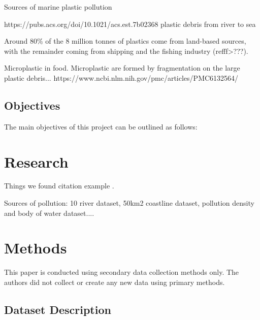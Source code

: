 \documentclass[10pt]{article}\usepackage[]{graphicx}\usepackage[]{color}
\begin{document}
Sources of marine plastic pollution

https://pubs.acs.org/doi/10.1021/acs.est.7b02368 plastic debris from river to sea

Around 80\% of the 8 million tonnes of plastics come from land-based sources, with the remainder coming from shipping and the fishing industry (refff>???). 

Microplastic in food. Microplastic are formed by fragmentation on the large plastic debris...
https://www.ncbi.nlm.nih.gov/pmc/articles/PMC6132564/



\subsection{Objectives }\label{obj}

The main objectives of this project can be outlined as follows: 




\section{Research}\label{research}

Things we found
citation example \cite{8489087}.

Sources of pollution: 10 river dataset, 50km2 coastline dataset, pollution density and body of water dataset....


\section {Methods}\label{methods}

This paper is conducted using secondary data collection methods only. The authors did not collect or create any new data using primary methods.


\subsection{Dataset Description}\label{dataset}
\end{document}
